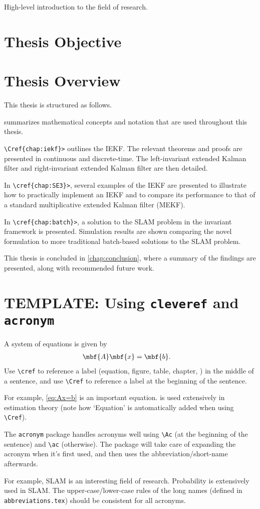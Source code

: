 High-level introduction to the field of research.

\section{Thesis Objective}

\section{Thesis Overview}

This thesis is structured as follows.

 summarizes mathematical concepts and notation that are used throughout this thesis. 

\verb+\Cref{chap:iekf}>+ outlines the IEKF. The relevant theorems and proofs are presented in continuous and discrete-time. The left-invariant extended Kalman filter and right-invariant extended Kalman filter are then detailed.

In \verb+\cref{chap:SE3}>+, several examples of the IEKF are presented to illustrate how to practically implement an IEKF and to compare its performance to that of a standard multiplicative extended Kalman filter (MEKF). 

In \verb+\cref{chap:batch}>+, a solution to the SLAM problem in the invariant framework is presented. Simulation results are shown comparing the novel formulation to more traditional batch-based solutions to the SLAM problem.

This thesis is concluded in \cref{chap:conclusion}, where a summary of the findings are presented, along with recommended future work.


\section{TEMPLATE: Using \texttt{cleveref} and \texttt{acronym}}
A system of equations is given by
\begin{align}
  \label{eq:Ax=b}
  \mbf{A} \mbf{x} 
    &= 
    \mbf{b}.
\end{align}
Use \verb+\cref+ to reference a label (equation, figure, table, chapter, \etc) in the middle of a sentence, and use \verb+\Cref+ to reference a label at the beginning of the sentence.

For example, \cref{eq:Ax=b} is an important equation.
 is used extensively in estimation theory (note how `Equation' is automatically added when using \verb+\Cref+).

The \texttt{acronym} package handles acronyms well using \verb+\Ac+ (at the beginning of the sentence) and \verb+\ac+ (otherwise).
The package will take care of expanding the acronym when it's first used, and then uses the abbreviation/short-name afterwards.

For example, \ac{SLAM} is an interesting field of research.
Probability is extensively used in \ac{SLAM}.
The upper-case/lower-case rules of the long names (defined in \texttt{abbreviations.tex}) should be consistent for all acronyms.
